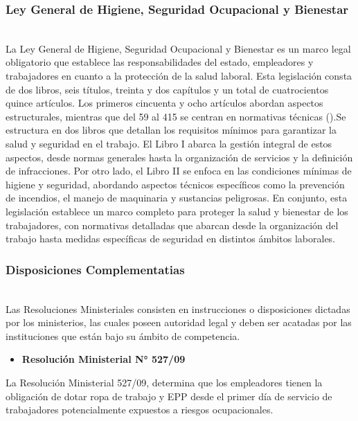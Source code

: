 \subsubsection{Ley General de Higiene, Seguridad Ocupacional y Bienestar}\hfill\\
\indent
La Ley General de Higiene, Seguridad Ocupacional y Bienestar es un marco legal obligatorio que establece las responsabilidades del estado, empleadores y trabajadores en cuanto a la protección de la salud laboral. Esta legislación consta de dos libros, seis títulos, treinta y dos capítulos y un total de cuatrocientos quince artículos. Los primeros cincuenta y ocho artículos abordan aspectos estructurales, mientras que del 59 al 415 se centran en normativas técnicas (\cite{compendioLeyGeneralDelTrabajo}).Se estructura en dos libros que detallan los requisitos mínimos para garantizar la salud y seguridad en el trabajo. El Libro I abarca la gestión integral de estos aspectos, desde normas generales hasta la organización de servicios y la definición de infracciones. Por otro lado, el Libro II se enfoca en las condiciones mínimas de higiene y seguridad, abordando aspectos técnicos específicos como la prevención de incendios, el manejo de maquinaria y sustancias peligrosas. En conjunto, esta legislación establece un marco completo para proteger la salud y bienestar de los trabajadores, con normativas detalladas que abarcan desde la organización del trabajo hasta medidas específicas de seguridad en distintos ámbitos laborales.

\subsubsection{Disposiciones Complementatias} \hfill\\
\indent
Las Resoluciones Ministeriales consisten en instrucciones o disposiciones dictadas por los ministerios, las cuales poseen autoridad legal y deben ser acatadas por las instituciones que están bajo su ámbito de competencia.

\begin{samepage}
\begin{itemize} [wide=0pt, topsep=0pt] \item \textbf{Resolución Ministerial N° 527/09} \end{itemize} 

\indent
La Resolución Ministerial 527/09, determina que los empleadores tienen la obligación de dotar ropa de trabajo y EPP desde el primer día de servicio de trabajadores potencialmente expuestos a riesgos ocupacionales.
\end{samepage}

